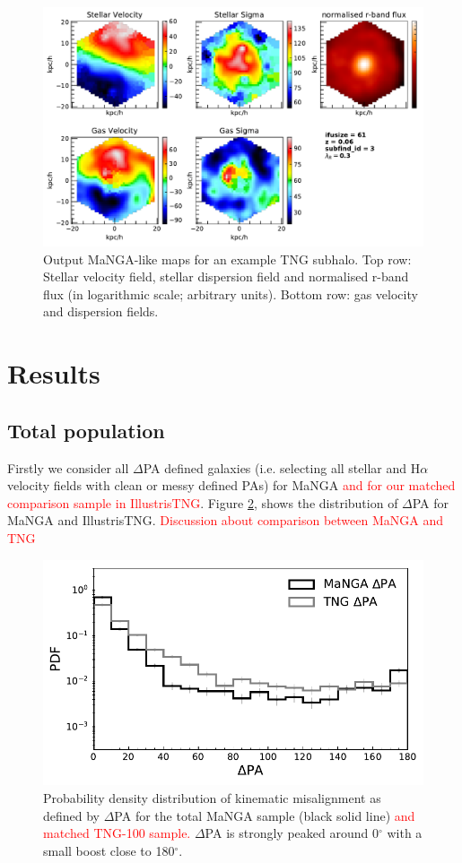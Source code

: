 \documentclass[fleqn,usenatbib]{mnras}
\newcommand{\red}[1]{{\textcolor{red}{#1}}}
\begin{document}
\begin{figure}
	\includegraphics[width=\linewidth]{example_grid.pdf}
    \caption{Output MaNGA-like maps for an example TNG subhalo. Top row: Stellar velocity field, stellar dispersion field and normalised r-band flux (in logarithmic scale; arbitrary units). Bottom row: gas velocity and dispersion fields.}
    \label{fig:example_obs}
\end{figure}

\section{Results}
\subsection{Total population}
Firstly we consider all $\Delta$PA defined galaxies (i.e. selecting all stellar and H$\alpha$ velocity fields with clean or messy defined PAs) for MaNGA \red{and for our matched comparison sample in IllustrisTNG}. Figure \ref{fig:total_pa_dist}, shows the distribution of $\Delta$PA for MaNGA and IllustrisTNG. \red{Discussion about comparison between MaNGA and TNG}

\begin{figure}
	\includegraphics[width=\linewidth]{total_pop/mpl8_pa_dist.pdf}
    \caption{Probability density distribution of kinematic misalignment as defined by $\Delta$PA for the total MaNGA sample (black solid line) \red{and matched TNG-100 sample.} $\Delta$PA is strongly peaked around 0$^{\circ}$ with a small boost close to 180$^{\circ}$.}
    \label{fig:total_pa_dist}
\end{figure}
\end{document}
